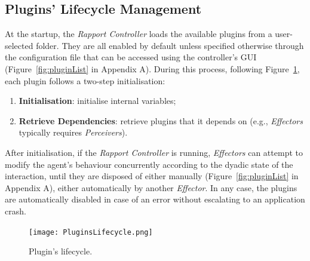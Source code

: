 
\subsection{Plugins' Lifecycle Management}
\label{sub:sec:pluginLifecycle}

At the startup, the \textit{Rapport Controller} loads the available plugins from a user-selected folder. They are all enabled by default unless specified otherwise through the configuration file that can be accessed using the controller's \ac{GUI} (Figure~\ref{fig:pluginList} in Appendix A). During this process, following Figure~\ref{fig:pluginLifecycle}, each plugin follows a two-step initialisation:

\begin{enumerate}
	\item \textbf{Initialisation}: initialise internal variables;
	\item \textbf{Retrieve Dependencies}: retrieve plugins that it depends on (e.g., \textit{Effectors} typically requires \textit{Perceivers}).
\end{enumerate}

After initialisation, if the \textit{Rapport Controller} is running, \textit{Effectors} can attempt to modify the agent's behaviour concurrently according to the dyadic state of the interaction, until they are disposed of either manually (Figure~\ref{fig:pluginList} in Appendix A), either automatically by another \textit{Effector}. In any case, the plugins are automatically disabled in case of an error without escalating to an application crash.

\begin{figure}[H]
	\centering
	\texttt{[image: PluginsLifecycle.png]}
	\caption{Plugin's lifecycle.}
	\label{fig:pluginLifecycle}
\end{figure}

